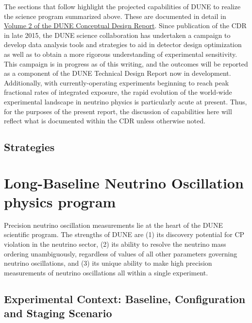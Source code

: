 The sections that follow highlight the projected capabilities of DUNE to realize the science program 
summarized above. These are documented in detail in \href{http://arxiv.org/abs/1512.06148}{Volume 2 
of the DUNE Conceptual Design Report}.  Since publication of the CDR in late 2015, the DUNE science 
collaboration has undertaken a campaign to develop data analysis tools and strategies to aid 
in detector design optimization as well as to obtain a more rigorous understanding of experimental 
sensitivity.  This campaign is in progress as of this writing, and the outcomes will be reported 
as a component of the DUNE Technical Design Report now in development.  Additionally, with 
currently-operating experiments beginning to reach peak fractional rates of integrated exposure, 
the rapid evolution of the world-wide experimental landscape in neutrino physics is particularly acute 
at present.  Thus, for the purposes of the present report, the discussion of capabilities here 
will reflect what is documented within the CDR unless otherwise noted.

\subsection{Strategies}
\label{sec:exec-summ-physics-ryan}


\section{Long-Baseline Neutrino Oscillation physics program}
\label{sec:exec-summ-physics-osc}

Precision neutrino oscillation measurements lie at the heart of the DUNE scientific program.  The strengths of DUNE are (1) its discovery potential for CP violation in the neutrino sector, (2) its ability to resolve the neutrino mass ordering unambiguously, regardless of values of all other parameters governing neutrino oscillations, and (3) its unique ability to make high precision measurements of neutrino oscillations all within a single experiment.

\subsection{Experimental Context: Baseline, Configuration and Staging Scenario}

